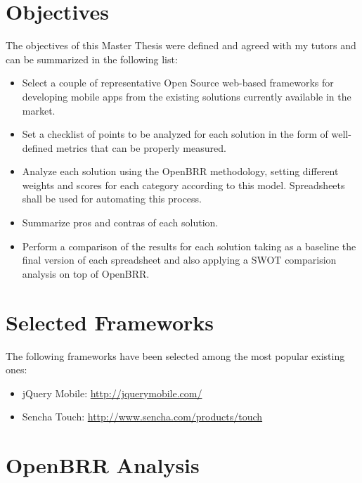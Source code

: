 \documentclass[a4paper,12pt]{book}
\begin{document}
\chapter{Objectives}
\label{chap:objectives}

The objectives of this Master Thesis were defined and agreed with my tutors and can be summarized in the following list:

\begin{itemize}
\item Select a couple of representative Open Source web-based frameworks for developing mobile apps from the existing solutions currently available in the market.
\item Set a checklist of points to be analyzed for each solution in the form of well-defined metrics that can be properly measured.
\item Analyze each solution using the OpenBRR methodology, setting different weights and scores for each category according to this model. Spreadsheets shall be used for automating this process.
\item Summarize pros and contras of each solution.
\item Perform a comparison of the results for each solution taking as a baseline the final version of each spreadsheet and also applying a SWOT comparision analysis on top of OpenBRR.
\end{itemize}


\chapter{Selected Frameworks}
\label{chap:tech}

The following frameworks have been selected among the most popular existing ones:

\begin{itemize}
 \item jQuery Mobile: \url{http://jquerymobile.com/}
 \item Sencha Touch: \url{http://www.sencha.com/products/touch}
\end{itemize}



\chapter{OpenBRR Analysis}
\label{chap:openbrr}
\end{document}
